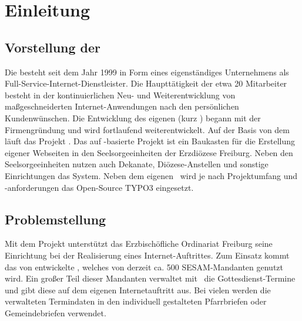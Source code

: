 \chapter{Einleitung}\label{einleitung}

\section{Vorstellung der \webco}
Die \webco besteht seit dem Jahr 1999 in Form eines eigenständiges Unternehmens als Full-Service-Internet-Dienstleister. Die Haupttätigkeit der etwa 20 Mitarbeiter besteht in der kontinuierlichen Neu- und Weiterentwicklung von maßgeschneiderten Internet-Anwendungen nach den persönlichen Kundenwünschen. Die Entwicklung des eigenen \cms (kurz \cms) \edith begann mit der Firmengründung und wird fortlaufend weiterentwickelt. Auf der Basis von dem \cmsEdith\, läuft das Projekt \qmUO{\sesam}. 
\abschnitt
Das auf \edith-basierte Projekt \qmUO{\sesam} ist ein Baukasten für die Erstellung eigener Webseiten in den Seelsorgeeinheiten der Erzdiözese Freiburg. Neben den Seelsorgeeinheiten nutzen auch Dekanate, Diözese-Anstellen und sonstige Einrichtungen das System.
\abschnitt
Neben dem eigenen \cmsEdith\, wird je nach Projektumfang und -anforderungen das Open-Source \cms TYPO3 eingesetzt.


\section{Problemstellung} \label{problemstellung}
Mit dem Projekt  unterstützt das Erzbischöfliche Ordinariat Freiburg seine Einrichtung bei der Realisierung eines Internet-Auftrittes. Zum Einsatz kommt das von \webco entwickelte \cmsEdith, welches von derzeit ca. 500 SESAM-Mandanten genutzt wird.
\abschnitt
Ein großer Teil dieser Mandanten verwaltet mit \edith\, die Gottesdienst-Termine und gibt diese auf dem eigenen Internetauftritt aus. Bei vielen werden die verwalteten Termindaten in den individuell gestalteten Pfarrbriefen oder Gemeindebriefen verwendet.


